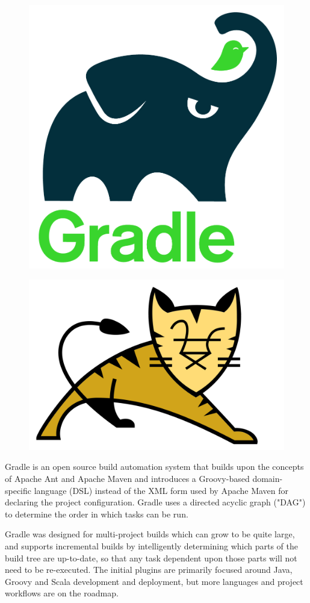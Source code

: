 \begin{figure}[h]
	\begin{minipage}{.5\textwidth}
		\centering
		\includegraphics[width=.5\linewidth]{images/gradlephant}
		\label{fig:gradle-logo}
	\end{minipage}%
	\begin{minipage}{.5\textwidth}
		\centering
		\includegraphics[width=.5\linewidth]{images/tomcat}
		\label{fig:tomcat-logo}
	\end{minipage}
\end{figure}

Gradle is an open source build automation system that builds upon the concepts of Apache Ant and Apache Maven and introduces a Groovy-based domain-specific language (DSL) instead of the XML form used by Apache Maven for declaring the project configuration. Gradle uses a directed acyclic graph ("DAG") to determine the order in which tasks can be run.
\newline

Gradle was designed for multi-project builds which can grow to be quite large, and supports incremental builds by intelligently determining which parts of the build tree are up-to-date, so that any task dependent upon those parts will not need to be re-executed.
The initial plugins are primarily focused around Java, Groovy and Scala development and deployment, but more languages and project workflows are on the roadmap.
\newline

